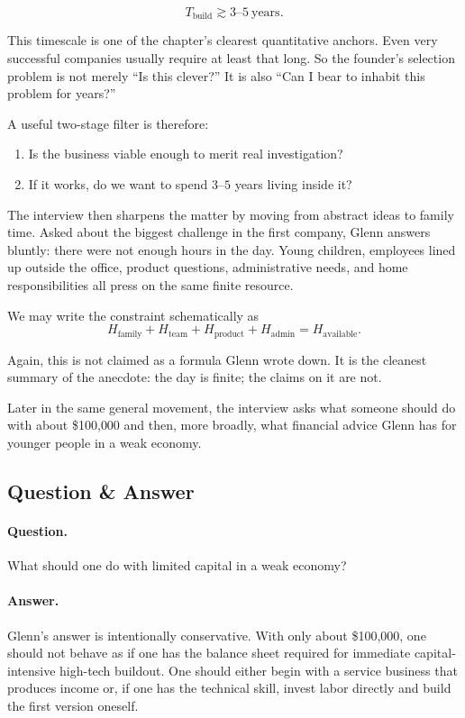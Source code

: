 \begin{equation}
T_{\mathrm{build}} \gtrsim 3\text{--}5\ \mathrm{years}.
\end{equation}

This timescale is one of the chapter's clearest quantitative anchors. Even very successful companies usually require at least that long. So the founder's selection problem is not merely ``Is this clever?'' It is also ``Can I bear to inhabit this problem for years?''

A useful two-stage filter is therefore:
\begin{enumerate}
\item Is the business viable enough to merit real investigation?
\item If it works, do we want to spend \(3\text{--}5\) years living inside it?
\end{enumerate}

The interview then sharpens the matter by moving from abstract ideas to family time. Asked about the biggest challenge in the first company, Glenn answers bluntly: there were not enough hours in the day. Young children, employees lined up outside the office, product questions, administrative needs, and home responsibilities all press on the same finite resource.

We may write the constraint schematically as
\begin{equation}
H_{\mathrm{family}} + H_{\mathrm{team}} + H_{\mathrm{product}} + H_{\mathrm{admin}}
= H_{\mathrm{available}}.
\end{equation}

Again, this is not claimed as a formula Glenn wrote down. It is the cleanest summary of the anecdote: the day is finite; the claims on it are not.

Later in the same general movement, the interview asks what someone should do with about \$100{,}000 and then, more broadly, what financial advice Glenn has for younger people in a weak economy.

\subsection{Question \& Answer}

\paragraph{Question.} What should one do with limited capital in a weak economy?

\paragraph{Answer.} Glenn's answer is intentionally conservative. With only about \$100{,}000, one should not behave as if one has the balance sheet required for immediate capital-intensive high-tech buildout. One should either begin with a service business that produces income or, if one has the technical skill, invest labor directly and build the first version oneself.

